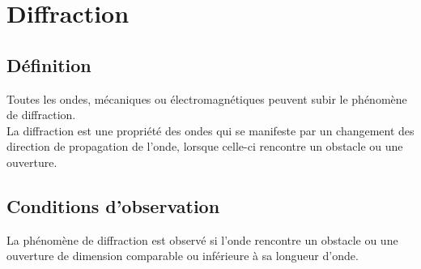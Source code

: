 \documentclass[a4paper,12pt,fleqn]{scrartcl}%
\begin{document}
\maketitle

\section{Diffraction}
	\subsection{Définition}
	Toutes les ondes, mécaniques ou électromagnétiques peuvent subir le phénomène de diffraction.\\
	La diffraction est une propriété des ondes qui se manifeste par un changement des direction de propagation de l'onde, lorsque celle-ci rencontre un obstacle ou une ouverture.
	\subsection{Conditions d'observation}
	La phénomène de diffraction est observé si l'onde rencontre un obstacle ou une ouverture de dimension comparable ou inférieure à sa longueur d'onde.
\end{document}
